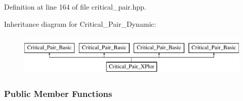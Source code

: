 Definition at line 164 of file critical\+\_\+pair.\+hpp.

Inheritance diagram for Critical\+\_\+\+Pair\+\_\+\+Dynamic\+:\begin{figure}[H]
\begin{center}
\leavevmode
\includegraphics[height=2.000000cm]{group___g_b_computation}
\end{center}
\end{figure}
\subsubsection*{Public Member Functions}
